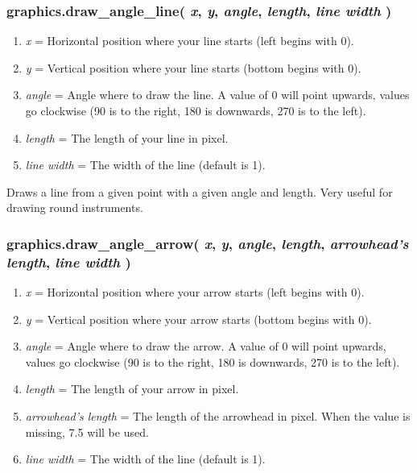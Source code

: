 \documentclass[11pt,parskip=half,a4paper]{scrartcl}
\begin{document}
\subsubsection{graphics.draw\_angle\_line( \emph{x}, \emph{y}, \emph{angle}, \emph{length}, \emph{line width} )}

\begin{enumerate}
	\item \emph{x} = Horizontal position where your line starts (left begins with 0).
	\item \emph{y} = Vertical position where your line starts (bottom begins with 0).
	\item \emph{angle} = Angle where to draw the line. A value of 0 will point upwards, values go clockwise (90 is to the right, 180 is downwards, 270 is to the left).
	\item \emph{length} = The length of your line in pixel.
	\item \emph{line width} = The width of the line (default is 1).

\end{enumerate}

Draws a line from a given point with a given angle and length. Very useful for drawing round instruments.

\subsubsection{graphics.draw\_angle\_arrow( \emph{x}, \emph{y}, \emph{angle}, \emph{length}, \emph{arrowhead's length}, \emph{line width} )}

\begin{enumerate}
	\item \emph{x} = Horizontal position where your arrow starts (left begins with 0).
	\item \emph{y} = Vertical position where your arrow starts (bottom begins with 0).
	\item \emph{angle} = Angle where to draw the arrow. A value of 0 will point upwards, values go clockwise (90 is to the right, 180 is downwards, 270 is to the left).
	\item \emph{length} = The length of your arrow in pixel.
	\item \emph{arrowhead's length} = The length of the arrowhead in pixel. When the value is missing, 7.5 will be used.
	\item \emph{line width} = The width of the line (default is 1).
\end{enumerate}
\end{document}
